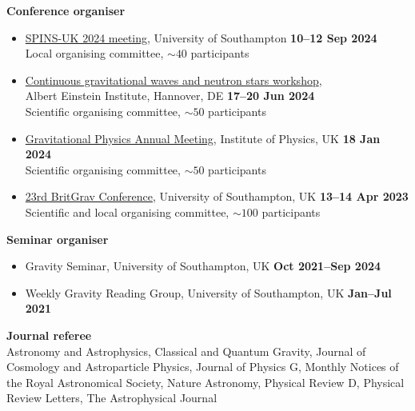 \documentclass[%
    margin,
    line,
    11pt,
]{res}
\begin{document}
\begin{resume}
\ifx\nopubs\undefined
%
\else
\newpage
\fi

\textbf{Conference organiser}
\vspace*{0.05in}
\begin{itemize}
    \item[]
    \href{https://sites.google.com/view/spins-uk-2024}{SPINS-UK 2024 meeting},
    University of Southampton
    \hfill \textbf{10--12 Sep 2024} \\
    \hspace*{1em} Local organising committee, $\sim 40$ participants
    \item[]
    \href{https://plan.events.mpg.de/event/133}%
    {Continuous gravitational waves and neutron stars workshop}, \\
    Albert Einstein Institute, Hannover, DE \hfill \textbf{17--20 Jun 2024}\\
    \hspace*{1em} Scientific organising committee, $\sim 50$ participants
    \item[]
    \href{https://iop.eventsair.com/gpm2024/}%
    {Gravitational Physics Annual Meeting},
    Institute of Physics, UK \hfill \textbf{18 Jan 2024} \\
    \hspace*{1em} Scientific organising committee, $\sim 50$ participants
    \item[]
    \href{https://sites.google.com/view/britgrav23}{23rd BritGrav Conference},
    University of Southampton, UK \hfill \textbf{13--14 Apr 2023} \\
    \hspace*{1em} Scientific and local organising committee,
    $\sim 100$ participants
\end{itemize}

\textbf{Seminar organiser}
\vspace*{0.05in}
\begin{itemize}
    \item[] Gravity Seminar, University of Southampton, UK
    \hfill \textbf{Oct 2021--Sep 2024}
    \item[] Weekly Gravity Reading Group, University of Southampton, UK
    \hfill \textbf{Jan--Jul 2021}
\end{itemize}

\textbf{Journal referee}
\vspace*{0.05in} \\
\hspace*{1em}
Astronomy and Astrophysics,
Classical and Quantum Gravity,
Journal of Cosmology and Astroparticle Physics,
Journal of Physics G,
Monthly Notices of the Royal Astronomical Society,
Nature Astronomy,
Physical Review D,
Physical Review Letters,
The Astrophysical Journal


\end{resume}
\end{document}

